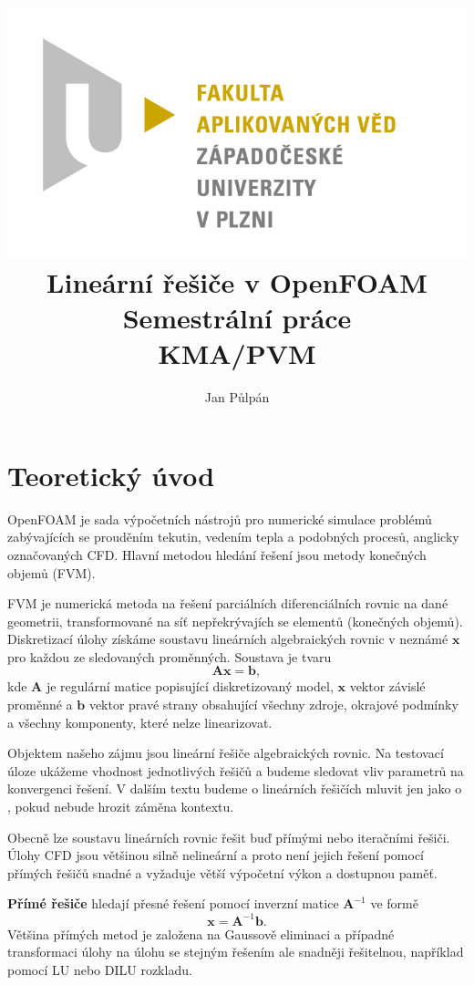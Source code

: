 \documentclass[a4paper,12pt]{report}
\title{
	{\includegraphics[width=\linewidth]{FAV_logo.jpg}}\\[2cm]
	{Lineární řešiče v OpenFOAM}\\	
	{\small{Semestrální práce}}\\
	{\small{KMA/PVM}}\\
}
\author{Jan Půlpán}
\theoremstyle{remark}
\begin{document}
	\maketitle

	{\let\clearpage\relax \chapter{Teoretický úvod}}

	OpenFOAM je sada výpočetních nástrojů pro numerické simulace problémů zabývajících se prouděním tekutin, vedením tepla a podobných procesů, anglicky označovaných CFD. Hlavní metodou  hledání řešení jsou metody konečných objemů (FVM). 
	
	FVM je numerická metoda na řešení parciálních diferenciálních rovnic na dané geometrii, transformované na síť nepřekrývajích se elementů (konečných objemů). Diskretizací úlohy získáme soustavu lineárních algebraických rovnic v neznámé $\boldsymbol{x}$ pro každou ze sledovaných proměnných. Soustava je tvaru
	\begin{equation}
		\boldsymbol{A}\boldsymbol{x} = \boldsymbol{b},
		\label{eq:linear_set}
	\end{equation}
	kde $\boldsymbol{A}$ je regulární matice popisující diskretizovaný model, $\boldsymbol{x}$ vektor závislé proměnné a $\boldsymbol{b}$ vektor pravé strany obsahující všechny zdroje, okrajové podmínky a všechny komponenty, které nelze linearizovat. 
	
	Objektem našeho zájmu jsou lineární řešiče algebraických rovnic. Na testovací úloze ukážeme vhodnost jednotlivých řešičů a budeme sledovat vliv parametrů na konvergenci řešení. V dalším textu budeme o lineárních řešičích mluvit jen jako o  , pokud nebude hrozit záměna kontextu.
	
	Obecně lze soustavu lineárních rovnic řešit buď přímými nebo iteračními řešiči. Úlohy CFD jsou většinou silně nelineární a proto není jejich řešení pomocí přímých řešičů snadné a vyžaduje větší výpočetní výkon a dostupnou paměť.
	
	\textbf{Přímé řešiče} hledají přesné řešení pomocí inverzní matice $\boldsymbol{A} ^{-1}$ ve formě
\begin{equation}
	\boldsymbol{x} = \boldsymbol{A}^{-1} \boldsymbol{b}.	
\end{equation}  
Většina přímých metod je založena na Gaussově eliminaci a případné transformaci úlohy na úlohu se stejným řešením ale snadněji řešitelnou, například pomocí LU nebo DILU rozkladu.
\end{document}
